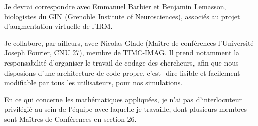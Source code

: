 \documentclass[a4paper,10pt]{article}
\begin{document}
\par
Je devrai correspondre avec Emmanuel Barbier et Benjamin Lemasson, biologistes du GIN (Grenoble Institute of Neurosciences), associ\'es au projet d'augmentation virtuelle de l'IRM.

\par
Je collabore, par ailleurs, avec Nicolas Glade (Ma\^itre de conf\'erences  l'Universit\'e Joseph Fourier, CNU 27), membre de TIMC-IMAG. %
Il prend notamment la responsabilit\'e d'organiser le travail de codage des chercheurs, afin que nous disposions d'une architecture de code propre, %
c'est--dire lisible et facilement modifiable par tous les utilisateurs, pour nos simulations.

\etoile
En ce qui concerne les math\'ematiques appliqu\'ees, je n'ai pas d'interlocuteur privil\'egi\'e au sein de l'\'equipe avec laquelle je travaille, %
dont plusieurs membres sont Ma\^itres de Conf\'erences en section 26.




\end{document}
